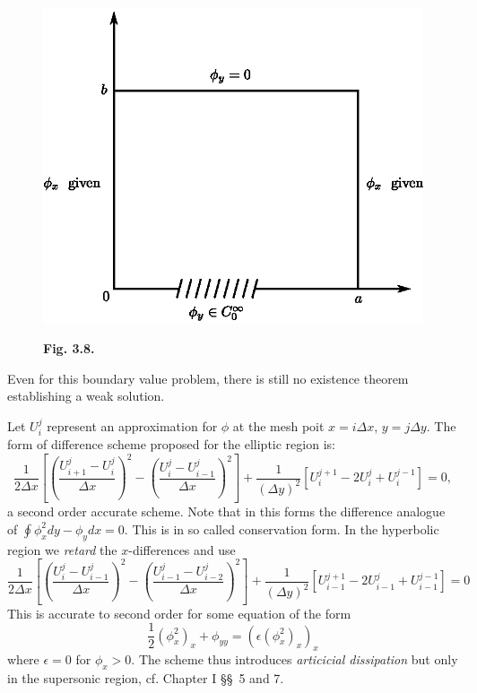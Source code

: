 \begin{figure}[H]
\centering
\includegraphics{figures/fig3.8.eps}
\centerline{\bf Fig. 3.8.}
\end{figure}\pageoriginale

\begin{remark*}
Even for this boundary value problem, there is still no existence theorem establishing a weak solution.
\end{remark*}

Let $U^j_i$ represent an approximation for $\phi$ at the mesh poit $x = i \Delta x$, $y = j \Delta y$. The form of difference scheme proposed for the elliptic region is:
\begin{equation*}
\frac{1}{2\Delta x} [(\frac{U^j_{i+1} - U^j_i}{\Delta x})^2 - (\frac{U^j_i - U^j_{i-1}}{\Delta x})^2] + \frac{1}{(\Delta y)^2}  [U^{j+1}_i - 2U^j_i + U^{j-1}_i] =0,  
\tag{3.37}\label{eq3.37}
\end{equation*}
a second order accurate scheme. Note that in this forms the difference analogue of $\oint \phi^2_x dy - \phi_y dx = 0$. This is in so called conservation form. In the hyperbolic region we {\em retard } the $x$-differences and use
\begin{equation*}
\frac{1}{2\Delta x} [(\frac{U^j_i - U^j_{i-1}}{\Delta x})^2 - (\frac{U^j_{i-1} - U^j_{i-2}}{\Delta x})^2] + \frac{1}{(\Delta y)^2 }  [U^{j+1}_{i-1} - 2U^j_{i-1} + U^{j-1}_{i-1}] = 0 \tag{3.38}\label{eq3.38}
\end{equation*}
This is accurate to second order for some equation of the form 
\begin{equation*}
\frac{1}{2} (\phi^2_x)_x + \phi_{yy} = (\epsilon(\phi^2_x)_x)_{x}\tag{3.39}\label{eq3.39}
\end{equation*}\pageoriginale
where $\epsilon =0$ for $\phi_x >0$. The scheme thus introduces {\em articicial dissipation} but only in the supersonic region, cf. Chapter I \S\S\ 5 and 7. 

